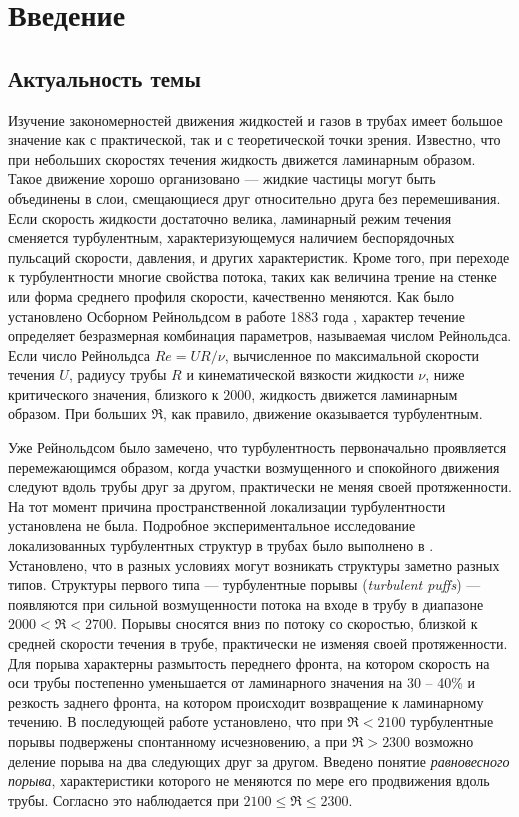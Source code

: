 \chapter{Введение}

\section{Актуальность темы} 

Изучение закономерностей движения жидкостей и газов в трубах имеет большое значение как с практической, так и с теоретической точки зрения. Известно, что при небольших скоростях течения жидкость движется ламинарным образом. Такое движение хорошо организовано --- жидкие частицы могут быть объединены в слои, смещающиеся друг относительно друга без перемешивания. Если скорость жидкости достаточно велика, ламинарный режим течения сменяется турбулентным, характеризующемуся наличием беспорядочных пульсаций скорости, давления, и других характеристик. Кроме того, при переходе к турбулентности многие свойства потока, таких как величина трение на стенке или форма среднего профиля скорости, качественно меняются. Как было установлено Осборном Рейнольдсом в работе 1883 года \cite{Reynolds1883}, характер течение определяет безразмерная комбинация параметров, называемая числом Рейнольдса. Если число Рейнольдса $Re=UR/\nu$, вычисленное по максимальной скорости течения $U$, радиусу трубы $R$ и кинематической вязкости жидкости $\nu$, ниже критического значения, близкого к $2000$, жидкость движется ламинарным образом. При больших $\Re$, как правило, движение оказывается турбулентным.

Уже Рейнольдсом было замечено, что турбулентность первоначально проявляется перемежающимся образом, когда участки возмущенного и спокойного движения следуют вдоль трубы друг за другом, практически не меняя своей протяженности. На тот момент причина пространственной локализации турбулентности установлена не была. Подробное экспериментальное исследование локализованных турбулентных структур в трубах было выполнено в \cite{Wygnanski1973}. Установлено, что в разных условиях могут возникать структуры заметно разных типов. Структуры первого типа --- турбулентные порывы ({\it turbulent puffs}) --- появляются при сильной возмущенности потока на входе в трубу в диапазоне $2000<\Re<2700$. Порывы сносятся вниз по потоку со скоростью, близкой к средней скорости течения в трубе, практически не изменяя своей протяженности. Для порыва характерны размытость переднего фронта, на котором скорость на оси трубы постепенно уменьшается от ламинарного значения на 30 -- 40\% и резкость заднего фронта, на котором происходит возвращение к ламинарному течению. В последующей работе \cite{Wygnanski1975} установлено, что при $\Re<2100$ турбулентные порывы подвержены спонтанному исчезновению, а при $\Re>2300$ возможно деление порыва на два следующих друг за другом. Введено понятие {\it равновесного порыва}, характеристики которого не меняются по мере его продвижения вдоль трубы. Согласно \cite{Wygnanski1975} это наблюдается при $2100\leqslant\Re\leqslant2300$. 

